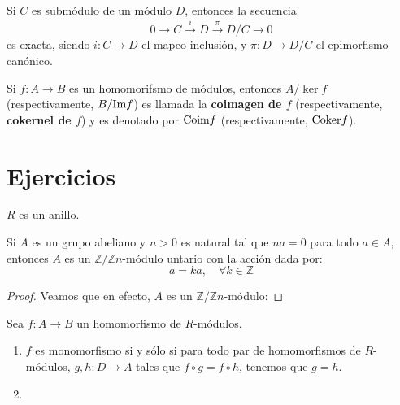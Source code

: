 \documentclass[12pt]{report}
\newcounter{it}
\theoremstyle{largebreak}
\newcommand\cf[3]{\ensuremath{#1:#2\rightarrow#3}}
\newcommand{\im}{\ensuremath{\textup{Im}}}
\newcommand{\coim}{\textup{Coim}}
\newcommand{\coker}{\textup{Coker}}
\begin{document}
    \begin{exa}
        Si $C$ es submódulo de un módulo $D$, entonces la secuencia
        \begin{equation*}
            0\rightarrow C\overset{i}{\rightarrow}D\overset{\pi}{\rightarrow}D/C\rightarrow0
        \end{equation*}
        es exacta, siendo $\cf{i}{C}{D}$ el mapeo inclusión, y $\cf{\pi}{D}{D/C}$ el epimorfismo canónico.
    \end{exa}

    \begin{mydef}
        Si $\cf{f}{A}{B}$ es un homomorifsmo de módulos, entonces $A/\ker f$ (respectivamente, $B/\im f$) es llamada la \textbf{coimagen de $f$} (respectivamente, \textbf{cokernel de $f$}) y es denotado por $\coim f$ (respectivamente, $\coker f$).
    \end{mydef}

    \begin{exa}
        
    \end{exa}


    \newpage

    \section{Ejercicios}

    \begin{obs}
        $R$ es un anillo.
    \end{obs}

    \begin{excer}
        Si $A$ es un grupo abeliano y $n>0$ es natural tal que $na=0$ para todo $a\in A$, entonces $A$ es un $\mathbb{Z}/\mathbb{Z}n$-módulo untario con la acción dada por:
        \begin{equation*}
            [k]a=ka,\quad\forall k\in\mathbb{Z}
        \end{equation*}
    \end{excer}

    \begin{proof}
        Veamos que en efecto, $A$ es un $\mathbb{Z}/\mathbb{Z}n$-módulo:
    \end{proof}

    \begin{excer}
        Sea $\cf{f}{A}{B}$ un homomorfismo de $R$-módulos.
        \begin{enumerate}[label = \textit{(\alph*)}]
            \item $f$ es monomorfismo si y sólo si para todo par de homomorfismos de $R$-módulos, $\cf{g,h}{D}{A}$ tales que $f\circ g=f\circ h$, tenemos que $g=h$.
            \item 
        \end{enumerate}
    \end{excer}
\end{document}
